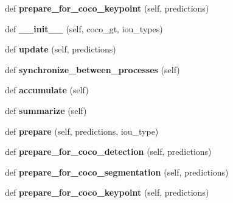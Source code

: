 \begin{DoxyCompactItemize}
def {\bfseries prepare\+\_\+for\+\_\+coco\+\_\+keypoint} (self, predictions)
\item 
\mbox{\label{classcoco__eval_1_1CocoEvaluator_aa6ca6db29fd99e5ad9593e09cfe612f7}} 
def {\bfseries \+\_\+\+\_\+init\+\_\+\+\_\+} (self, coco\+\_\+gt, iou\+\_\+types)
\item 
\mbox{\label{classcoco__eval_1_1CocoEvaluator_a066d983e53c241c8e1157232eee87bfc}} 
def {\bfseries update} (self, predictions)
\item 
\mbox{\label{classcoco__eval_1_1CocoEvaluator_af771ae7f67af60c60585f796b9790944}} 
def {\bfseries synchronize\+\_\+between\+\_\+processes} (self)
\item 
\mbox{\label{classcoco__eval_1_1CocoEvaluator_a75b0c29c47aae7c31dd488f8a09a76b6}} 
def {\bfseries accumulate} (self)
\item 
\mbox{\label{classcoco__eval_1_1CocoEvaluator_afe5b5f733e530d37dc2aa2be6bd07ffd}} 
def {\bfseries summarize} (self)
\item 
\mbox{\label{classcoco__eval_1_1CocoEvaluator_a787d74058162455b31ee3f7b9db3c801}} 
def {\bfseries prepare} (self, predictions, iou\+\_\+type)
\item 
\mbox{\label{classcoco__eval_1_1CocoEvaluator_a4782b814b562ff950acba6c0c85c20cb}} 
def {\bfseries prepare\+\_\+for\+\_\+coco\+\_\+detection} (self, predictions)
\item 
\mbox{\label{classcoco__eval_1_1CocoEvaluator_a4e68ed07bfac6e2c04baab7975191b75}} 
def {\bfseries prepare\+\_\+for\+\_\+coco\+\_\+segmentation} (self, predictions)
\item 
\mbox{\label{classcoco__eval_1_1CocoEvaluator_ac87c29e6c2361dab48e85dcbb734b760}} 
def {\bfseries prepare\+\_\+for\+\_\+coco\+\_\+keypoint} (self, predictions)
\end{DoxyCompactItemize}
